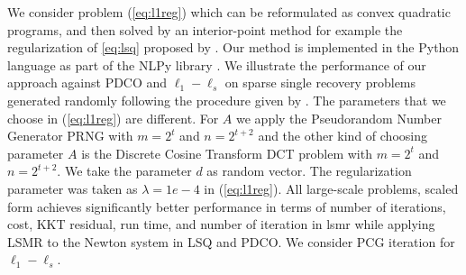 \documentclass{amsart}
\begin{document}
We consider problem (\ref{eq:l1reg}) which can be reformulated as convex quadratic programs, and then solved by an interior-point method for example the regularization of \eqref{eq:lsq} proposed by
\cite{friedlander-orban-2012}. Our method is implemented in the Python
language as part of the \textsf{NLPy} library \citep{orban-2012}. We illustrate the performance of our approach against PDCO and $\ell_1-\ell_s$  on sparse single recovery problems generated randomly following the procedure given by \cite{kim-koh-lustig-boyd-gorinevsky-2007}. 
The parameters that we choose in (\ref{eq:l1reg}) are different. For $A$ we apply the Pseudorandom Number Generator PRNG with $m=2^t$ and $n=2^{t+2}$ and the other kind of choosing parameter $A$ is the Discrete Cosine Transform DCT problem with $m=2^t$ and $n=2^{t+2}$. We take the parameter $d$ as random vector. The regularization parameter  was taken as $\lambda =1e-4$ in (\ref{eq:l1reg}).
All large-scale  problems,  scaled form  achieves significantly better performance in terms of   number of iterations, cost, KKT residual, run time, and number of iteration in lsmr   while applying LSMR to the Newton system in LSQ and PDCO. We consider  PCG iteration for $\ell_1-\ell_s$.









\end{document}
